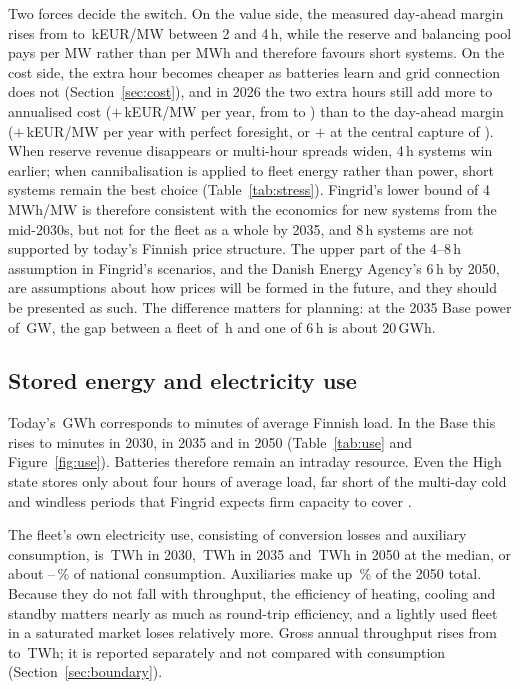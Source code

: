 \documentclass[11pt]{article}
\newcommand{\EUR}{EUR}
\begin{document}
Two forces decide the switch. On the value side, the measured day-ahead margin rises from  to \,k\EUR/MW between 2 and 4\,h, while the reserve and balancing pool pays per MW rather than per MWh and therefore favours short systems. On the cost side, the extra hour becomes cheaper as batteries learn and grid connection does not (Section~\ref{sec:cost}), and in 2026 the two extra hours still add more to annualised cost ($+$\,k\EUR/MW per year, from  to ) than to the day-ahead margin ($+$\,k\EUR/MW per year with perfect foresight, or $+$ at the central capture of ).
When reserve revenue disappears or multi-hour spreads widen, 4\,h systems win earlier; when cannibalisation is applied to fleet energy rather than power, short systems remain the best choice (Table~\ref{tab:stress}).
Fingrid's lower bound of 4\,MWh/MW is therefore consistent with the economics for new systems from the mid-2030s, but not for the fleet as a whole by 2035, and 8\,h systems are not supported by today's Finnish price structure. The upper part of the 4--8\,h assumption in Fingrid's scenarios, and the Danish Energy Agency's 6\,h by 2050, are assumptions about how prices will be formed in the future, and they should be presented as such.
The difference matters for planning: at the 2035 Base power of \,GW, the gap between a fleet of \,h and one of 6\,h is about 20\,GWh.

\subsection{Stored energy and electricity use}\label{sec:use}
Today's \,GWh corresponds to  minutes of average Finnish load. In the Base this rises to  minutes in 2030,  in 2035 and  in 2050 (Table~\ref{tab:use} and Figure~\ref{fig:use}).
Batteries therefore remain an intraday resource. Even the High state stores only about four hours of average load, far short of the multi-day cold and windless periods that Fingrid expects firm capacity to cover \citep{fingrid2026prospects}.

The fleet's own electricity use, consisting of conversion losses and auxiliary consumption, is \,TWh in 2030, \,TWh in 2035 and \,TWh in 2050 at the median, or about --\,\% of national consumption.
Auxiliaries make up \,\% of the 2050 total. Because they do not fall with throughput, the efficiency of heating, cooling and standby matters nearly as much as round-trip efficiency, and a lightly used fleet in a saturated market loses relatively more.
Gross annual throughput rises from  to \,TWh; it is reported separately and not compared with consumption (Section~\ref{sec:boundary}).
\end{document}
